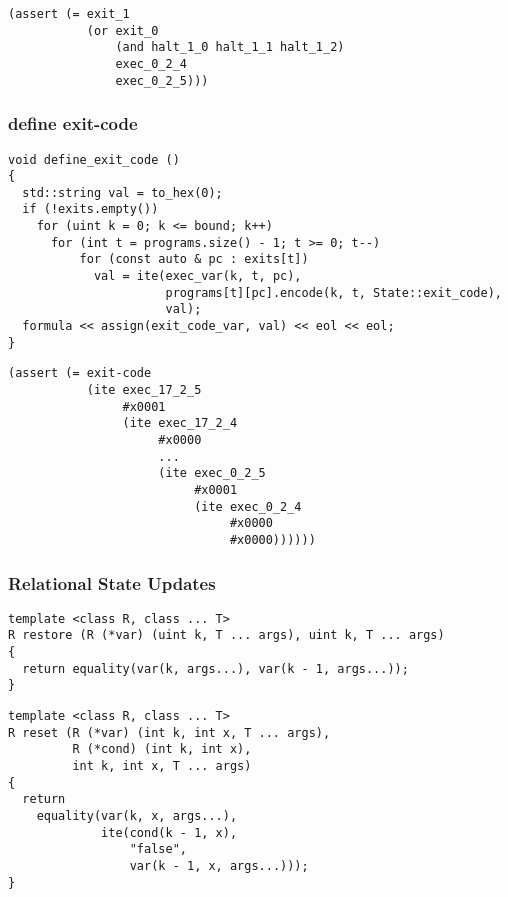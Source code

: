 \begin{lstlisting}[language=SMTLib]
(assert (= exit_1
           (or exit_0
               (and halt_1_0 halt_1_1 halt_1_2)
               exec_0_2_4
               exec_0_2_5)))
\end{lstlisting}

\subsubsection{define exit-code}

\begin{lstlisting}[style=c++]
void define_exit_code ()
{
  std::string val = to_hex(0);
  if (!exits.empty())
    for (uint k = 0; k <= bound; k++)
      for (int t = programs.size() - 1; t >= 0; t--)
          for (const auto & pc : exits[t])
            val = ite(exec_var(k, t, pc),
                      programs[t][pc].encode(k, t, State::exit_code),
                      val);
  formula << assign(exit_code_var, val) << eol << eol;
}
\end{lstlisting}

\begin{lstlisting}[language=SMTLib]
(assert (= exit-code
           (ite exec_17_2_5
                #x0001
                (ite exec_17_2_4
                     #x0000
                     ...
                     (ite exec_0_2_5
                          #x0001
                          (ite exec_0_2_4
                               #x0000
                               #x0000))))))
\end{lstlisting}

\subsubsection{Relational State Updates}

\begin{lstlisting}[style=c++]
template <class R, class ... T>
R restore (R (*var) (uint k, T ... args), uint k, T ... args)
{
  return equality(var(k, args...), var(k - 1, args...));
}
\end{lstlisting}

\begin{lstlisting}[style=c++]
template <class R, class ... T>
R reset (R (*var) (int k, int x, T ... args),
         R (*cond) (int k, int x),
         int k, int x, T ... args)
{
  return
    equality(var(k, x, args...),
             ite(cond(k - 1, x),
                 "false",
                 var(k - 1, x, args...)));
}
\end{lstlisting}

